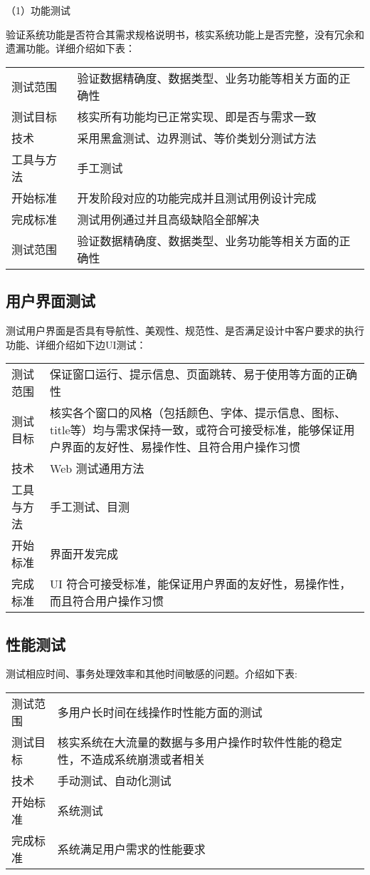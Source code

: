 （1）功能测试

验证系统功能是否符合其需求规格说明书，核实系统功能上是否完整，没有冗余和遗漏功能。详细介绍如下表：

\begin{longtable}[]{@{}ll@{}}
\toprule
测试范围 &
验证数据精确度、数据类型、业务功能等相关方面的正确性\tabularnewline
测试目标 & 核实所有功能均已正常实现、即是否与需求一致\tabularnewline
技术 & 采用黑盒测试、边界测试、等价类划分测试方法\tabularnewline
工具与方法 & 手工测试\tabularnewline
开始标准 & 开发阶段对应的功能完成并且测试用例设计完成\tabularnewline
完成标准 & 测试用例通过并且高级缺陷全部解决\tabularnewline
测试范围 &
验证数据精确度、数据类型、业务功能等相关方面的正确性\tabularnewline
\bottomrule
\end{longtable}


\subsection{用户界面测试}

  测试用户界面是否具有导航性、美观性、规范性、是否满足设计中客户要求的执行功能、详细介绍如下边UI测试：


\begin{longtable}[]{@{}ll@{}}
\toprule
测试范围 &
保证窗口运行、提示信息、页面跳转、易于使用等方面的正确性\tabularnewline
测试目标 &
核实各个窗口的风格（包括颜色、字体、提示信息、图标、title等）均与需求保持一致，或符合可接受标准，能够保证用户界面的友好性、易操作性、且符合用户操作习惯\tabularnewline
技术 & Web 测试通用方法\tabularnewline
工具与方法 & 手工测试、目测\tabularnewline
开始标准 & 界面开发完成\tabularnewline
完成标准 & UI
符合可接受标准，能保证用户界面的友好性，易操作性，而且符合用户操作习惯\tabularnewline
\bottomrule
\end{longtable}

\subsection{性能测试}

  测试相应时间、事务处理效率和其他时间敏感的问题。介绍如下表:


\begin{longtable}[]{@{}ll@{}}
\toprule
测试范围 & 多用户长时间在线操作时性能方面的测试\tabularnewline
测试目标 &
核实系统在大流量的数据与多用户操作时软件性能的稳定性，不造成系统崩溃或者相关\tabularnewline
技术 & 手动测试、自动化测试\tabularnewline
开始标准 & 系统测试\tabularnewline
完成标准 & 系统满足用户需求的性能要求\tabularnewline
\bottomrule
\end{longtable}


